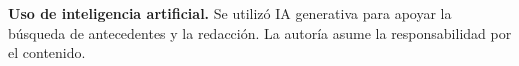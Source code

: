 \begingroup
\par\bigskip
\begingroup
\footnotesize
\textbf{Uso de inteligencia artificial.} Se utilizó IA generativa para apoyar la búsqueda de antecedentes y la redacción. La autoría asume la responsabilidad por el contenido.
\par
\endgroup
\par\endgroup
